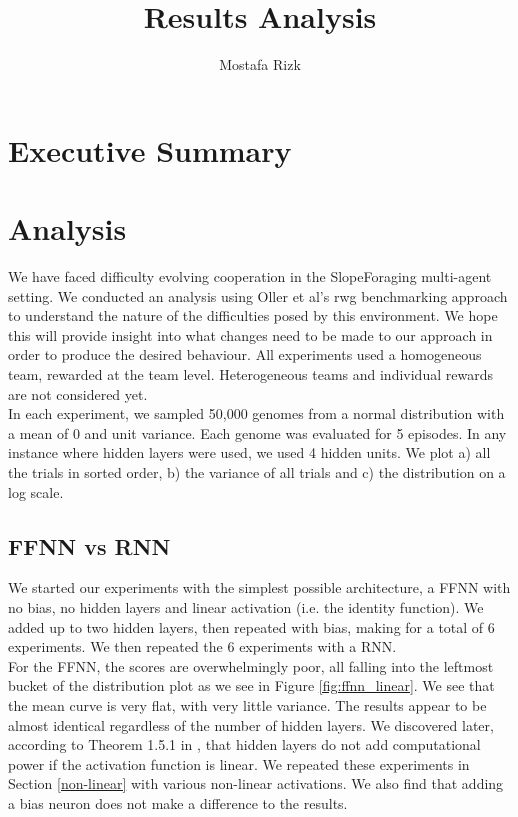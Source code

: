 \documentclass[12pt]{article}
\title{Results Analysis}
\author{Mostafa Rizk}
\begin{document}
\maketitle
\tableofcontents

\section{Executive Summary}

\section{Analysis}
		
We have faced difficulty evolving cooperation in the SlopeForaging multi-agent setting. We conducted an analysis using Oller et al's rwg benchmarking approach \cite{oller:2020:arXiv} to understand the nature of the difficulties posed by this environment. We hope this will provide insight into what changes need to be made to our approach in order to produce the desired behaviour. All experiments used a homogeneous team, rewarded at the team level. Heterogeneous teams and individual rewards are not considered yet.\\

In each experiment, we sampled 50,000 genomes from a normal distribution with a mean of 0 and unit variance. Each genome was evaluated for 5 episodes. In any instance where hidden layers were used, we used 4 hidden units. We plot a) all the trials in sorted order, b) the variance of all trials and c) the distribution on a log scale.
		
\subsection{FFNN vs RNN}

We started our experiments with the simplest possible architecture, a FFNN with no bias, no hidden layers and linear activation (i.e. the identity function). We added up to two hidden layers, then repeated with bias, making for a total of 6 experiments. We then repeated the 6 experiments with a RNN.\\

For the FFNN, the scores are overwhelmingly poor, all falling into the leftmost bucket of the distribution plot as we see in Figure \ref{fig:ffnn_linear}. We see that the mean curve is very flat, with very little variance. The results appear to be almost identical regardless of the number of hidden layers. We discovered later, according to Theorem 1.5.1 in \cite{aggarwal:2018:springer}, that hidden layers do not add computational power if the activation function is linear. We repeated these experiments in Section \ref{non-linear} with various non-linear activations. We also find that adding a bias neuron does not make a difference to the results.\\
\end{document}
